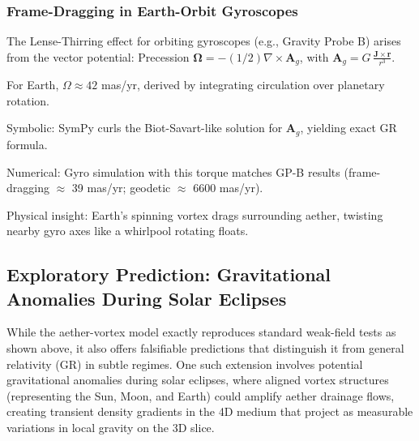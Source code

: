\subsubsection{Frame-Dragging in Earth-Orbit Gyroscopes}

The Lense-Thirring effect for orbiting gyroscopes (e.g., Gravity Probe B) arises from the vector potential: Precession $\boldsymbol{\Omega} = - (1/2) \nabla \times \mathbf{A}_g$, with $\mathbf{A}_g = G \, \frac{\mathbf{J} \times \mathbf{r}}{r^3}$.

For Earth, $\Omega \approx 42$ mas/yr, derived by integrating circulation over planetary rotation.

Symbolic: SymPy curls the Biot-Savart-like solution for $\mathbf{A}_g$, yielding exact GR formula.

Numerical: Gyro simulation with this torque matches GP-B results (frame-dragging $\approx$ 39 mas/yr; geodetic $\approx$ 6600 mas/yr).

Physical insight: Earth's spinning vortex drags surrounding aether, twisting nearby gyro axes like a whirlpool rotating floats.

\medskip
\noindent
{}
\medskip

\subsection{Exploratory Prediction: Gravitational Anomalies During Solar Eclipses}

While the aether-vortex model exactly reproduces standard weak-field tests as shown above, it also offers falsifiable predictions that distinguish it from general relativity (GR) in subtle regimes. One such extension involves potential gravitational anomalies during solar eclipses, where aligned vortex structures (representing the Sun, Moon, and Earth) could amplify aether drainage flows, creating transient density gradients in the 4D medium that project as measurable variations in local gravity on the 3D slice.

